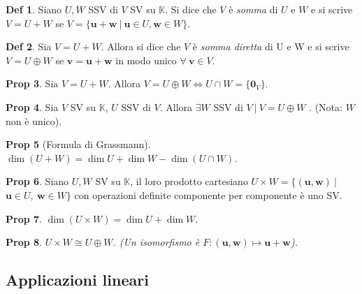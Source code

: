 \documentclass[]{article}
\newcommand{\bl}[1]{\mathbf{#1}}
\newcommand{\vu}{\mathbf{u}}
\newcommand{\vv}{\mathbf{v}}
\newcommand{\vw}{\mathbf{w}}
\theoremstyle{definition}
\theoremstyle{definition}
\newtheorem{prop}{Prop}[subsection]
\theoremstyle{definition}
\newtheorem{dfn}[prop]{Def}
\begin{document}
\begin{dfn} Siano $U, W$ SSV di $V$ SV su $\mathbb{K}$. Si dice che $V$ è \emph{somma} di $U$ e $W$ e si scrive $V= U + W$ se $V = \{ \vu + \vw \ | \ \vu \in U, \vw \in W \}$.

\end{dfn} \begin{dfn} Sia $V=U+W$. Allora si dice che $V$ è \emph{somma diretta} di U e W e si scrive $V=U \oplus W$ se $\vv = \vu + \vw $ in modo unico $\forall \ \vv \in V$.

\end{dfn} \begin{prop} Sia $V=U+W$. Allora $V=U \oplus W \Leftrightarrow U \cap W = \{ \bl{0} _V \}$.

\end{prop} \begin{prop} Sia $V$ SV su $\mathbb{K}$, $U$ SSV di $V$. Allora $\exists W$ SSV di $V \ | \ V=U \oplus W$ . (Nota: $W$ non è unico).

\end{prop} \begin{prop}[Formula di Grassmann]$\dim (U+W) = \dim U + \dim W - \dim (U \cap W)$.

\end{prop} \begin{prop} Siano $U, W$ SV su $\mathbb{K}$, il loro prodotto cartesiano $U \times W = \{ (\vu, \vw) \ |$ $\vu \in U,\ \vw \in W \}$ con operazioni definite componente per componente è uno SV.

\end{prop} \begin{prop} $\dim (U \times W)= \dim U + \dim W$.

\end{prop} \begin{prop} \textit{$U \times W \cong U \oplus W$. (Un isomorfismo è $F: (\vu ,\vw ) \mapsto \vu +\vw $).}
\end{prop}

\subsection{Applicazioni lineari}
\end{document}
